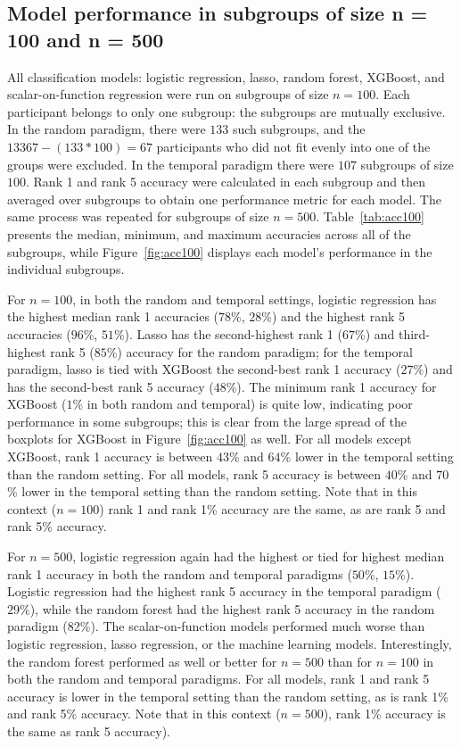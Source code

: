 \subsection{Model performance in subgroups of size n = 100 and n = 500}
All classification models: logistic regression, lasso, random forest, XGBoost, and scalar-on-function regression were run on subgroups of size $n=100$. Each participant belongs to only one subgroup: the subgroups are mutually exclusive. In the random paradigm, there were $133$ such subgroups, and the $13367-(133*100) = 67$ participants who did not fit evenly into one of the groups were excluded. In the temporal paradigm there were $107$ subgroups of size $100$. Rank 1 and rank 5 accuracy were calculated in each subgroup and then averaged over subgroups to obtain one performance metric for each model. The same process was repeated for subgroups of size $n=500$. Table~\ref{tab:acc100} presents the median, minimum, and maximum accuracies across all of the subgroups, while Figure~\ref{fig:acc100} displays each model's performance in the individual subgroups. 

For $n=100$, in both the random and temporal settings, logistic regression has the highest median rank 1 accuracies ($78$\%, $28$\%) and the highest rank 5 accuracies ($96$\%, $51$\%). Lasso has the second-highest rank 1 ($67$\%) and third-highest rank 5 ($85$\%) accuracy for the random paradigm; for the temporal paradigm, lasso is tied with XGBoost the second-best rank 1 accuracy ($27$\%) and has the second-best rank 5 accuracy ($48$\%). The minimum rank 1 accuracy for XGBoost ($1$\% in both random and temporal) is quite low, indicating poor performance in some subgroups; this is clear from the large spread of the boxplots for XGBoost in Figure~\ref{fig:acc100} as well. For all models except XGBoost, rank 1 accuracy is between $43$\% and $64$\% lower in the temporal setting than the random setting. For all models, rank 5 accuracy is between $40$\% and $70$\% lower in the temporal setting than the random setting. Note that in this context ($n=100$) rank 1 and rank 1\% accuracy are the same, as are rank 5 and rank 5\% accuracy.

For $n=500$, logistic regression again had the highest or tied for highest median rank 1 accuracy in both the random and temporal paradigms ($50$\%, $15$\%). Logistic regression had the highest rank 5 accuracy in the temporal paradigm ($29\%$), while the random forest had the highest rank 5 accuracy in the random paradigm (82\%). The scalar-on-function models performed much worse than logistic regression, lasso regression, or the machine learning models. Interestingly, the random forest performed as well or better for $n=500$ than for $n=100$ in both the random and temporal paradigms.  For all models, rank 1 and rank 5 accuracy is lower in the temporal setting than the random setting, as is rank 1\% and rank 5\% accuracy. Note that in this context ($n=500$), rank 1\% accuracy is the same as rank 5 accuracy). 


